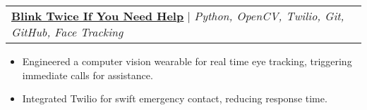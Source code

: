 \documentclass[letterpaper]{article}
\makeatletter
\newcommand{\resumeItem}[1]{
  \item\small{
    {#1 \vspace{-2pt}}
  }
}
\newcommand{\resumeProjectHeading}[2]{
    \item
    \begin{tabular*}{0.97\textwidth}{l@{\extracolsep{\fill}}r}
      \small#1 & #2 \\
    \end{tabular*}\vspace{-7pt}
}
\newcommand{\resumeProjectHeadingWithDetails}[4]{
    \item
    \begin{tabular*}{0.97\textwidth}{l@{\extracolsep{\fill}}r}
      \small#1 & #2 \\[5pt] %
      \textit{\small#3} & \textit{\small #4} \\
    \end{tabular*}\vspace{-7pt}
}
\newcommand{\resumeItemListStart}{\begin{itemize}}
\newcommand{\resumeItemListEnd}{\end{itemize}\vspace{-5pt}}
\makeatother
\begin{document}

      \resumeProjectHeading
          {\textbf{\underline{\href{https://devpost.com/software/blink-twice-if-you-need-help}{Blink Twice If You Need Help}}} $|$ \emph{Python, OpenCV, Twilio, Git, GitHub, Face Tracking}}{}
          \resumeItemListStart
            \resumeItem{Engineered a computer vision wearable for real time eye tracking, triggering immediate calls for assistance.}
            \resumeItem{Integrated Twilio for swift emergency contact, reducing response time.}
          \resumeItemListEnd    



    
\end{document}
